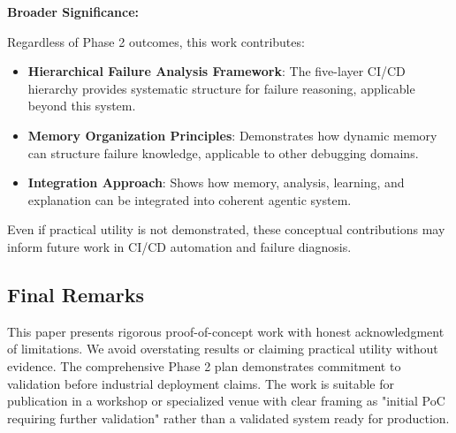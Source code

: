 \documentclass[11pt]{article}
\begin{document}
\textbf{Broader Significance:}

Regardless of Phase 2 outcomes, this work contributes:

\begin{itemize}
    \item \textbf{Hierarchical Failure Analysis Framework}: The five-layer CI/CD hierarchy provides systematic structure for failure reasoning, applicable beyond this system.

    \item \textbf{Memory Organization Principles}: Demonstrates how dynamic memory can structure failure knowledge, applicable to other debugging domains.

    \item \textbf{Integration Approach}: Shows how memory, analysis, learning, and explanation can be integrated into coherent agentic system.
\end{itemize}

Even if practical utility is not demonstrated, these conceptual contributions may inform future work in CI/CD automation and failure diagnosis.

\subsection{Final Remarks}

This paper presents rigorous proof-of-concept work with honest acknowledgment of limitations. We avoid overstating results or claiming practical utility without evidence. The comprehensive Phase 2 plan demonstrates commitment to validation before industrial deployment claims. The work is suitable for publication in a workshop or specialized venue with clear framing as "initial PoC requiring further validation" rather than a validated system ready for production.
\end{document}
